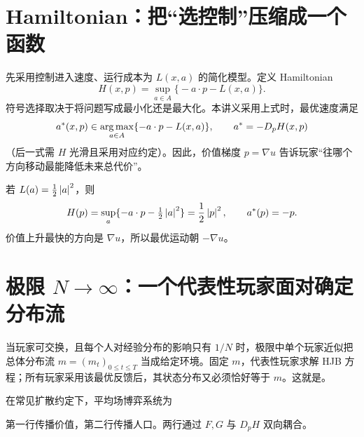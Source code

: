 \section{Hamiltonian：把“选控制”压缩成一个函数}

先采用控制进入速度、运行成本为 $L(x,a)$ 的简化模型。定义 Hamiltonian
\[
H(x,p)=\sup_{a\in A}\bigl\{-a\cdot p-L(x,a)\bigr\}.
\]
符号选择取决于将问题写成最小化还是最大化。本讲义采用上式时，最优速度满足
\[
a^*(x,p)\in\operatorname*{arg\,max}_{a\in A}\{-a\cdot p-L(x,a)\},
\qquad a^*=-D_pH(x,p)
\]
（后一式需 $H$ 光滑且采用对应约定）。因此，价值梯度 $p=\nabla u$ 告诉玩家“往哪个方向移动最能降低未来总代价”。

\begin{examplebox}[二次动能]
若 $L(a)=\tfrac12\left\lvert a\right\rvert^2$，则
\[
H(p)=\sup_a\{-a\cdot p-\tfrac12\left\lvert a\right\rvert^2\}
=\frac12\left\lvert p\right\rvert^2,
\qquad a^*(p)=-p.
\]
价值上升最快的方向是 $\nabla u$，所以最优运动朝 $-\nabla u$。
\end{examplebox}

\section{极限 \texorpdfstring{$N\to\infty$}{N→∞}：一个代表性玩家面对确定分布流}

当玩家可交换，且每个人对经验分布的影响只有 $1/N$ 时，极限中单个玩家近似把总体分布流 $m=(m_t)_{0\le t\le T}$ 当成给定环境。固定 $m$，代表性玩家求解 HJB 方程；所有玩家采用该最优反馈后，其状态分布又必须恰好等于 $m$。这就是。

在常见扩散约定下，平均场博弈系统为

第一行传播价值，第二行传播人口。两行通过 $F,G$ 与 $D_pH$ 双向耦合。

\begin{center}
\end{center}

